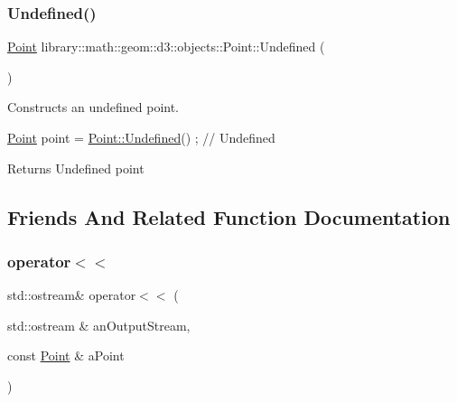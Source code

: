 \subsubsection{\texorpdfstring{Undefined()}{Undefined()}}
{\footnotesize\ttfamily \hyperlink{classlibrary_1_1math_1_1geom_1_1d3_1_1objects_1_1_point}{Point} library\+::math\+::geom\+::d3\+::objects\+::\+Point\+::\+Undefined (\begin{DoxyParamCaption}{ }\end{DoxyParamCaption})\hspace{0.3cm}{\ttfamily [static]}}



Constructs an undefined point. 


\begin{DoxyCode}
\hyperlink{classlibrary_1_1math_1_1geom_1_1d3_1_1objects_1_1_point_a617e690ab6091af3de729cee337e309e}{Point} point = \hyperlink{classlibrary_1_1math_1_1geom_1_1d3_1_1objects_1_1_point_a7c4c9c71f9b29b85925d8a7ed4943501}{Point::Undefined}() ; \textcolor{comment}{// Undefined}
\end{DoxyCode}


\begin{DoxyReturn}{Returns}
Undefined point 
\end{DoxyReturn}


\subsection{Friends And Related Function Documentation}
\mbox{\label{classlibrary_1_1math_1_1geom_1_1d3_1_1objects_1_1_point_ac6c8450721254f3cefdea7dcdd5f5001}} 
\subsubsection{\texorpdfstring{operator$<$$<$}{operator<<}}
{\footnotesize\ttfamily std\+::ostream\& operator$<$$<$ (\begin{DoxyParamCaption}\item[{std\+::ostream \&}]{an\+Output\+Stream,  }\item[{const \hyperlink{classlibrary_1_1math_1_1geom_1_1d3_1_1objects_1_1_point}{Point} \&}]{a\+Point }\end{DoxyParamCaption})\hspace{0.3cm}{\ttfamily [friend]}}



